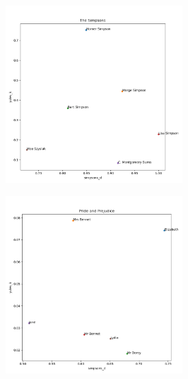 \documentclass{article}
\newcommand{\mediumimagewidth}{250}
\begin{document}
\begin{titlepage}
\begin{figure}[H]
\centering
\includegraphics[width=\mediumimagewidth]{images/The Simpsons_heuristics.png}
\end{figure}

\begin{figure}[H]
\centering
\includegraphics[width=\mediumimagewidth]{images/Pride and Prejudice_heuristics.png}
\end{figure}


\end{titlepage}
\end{document}
